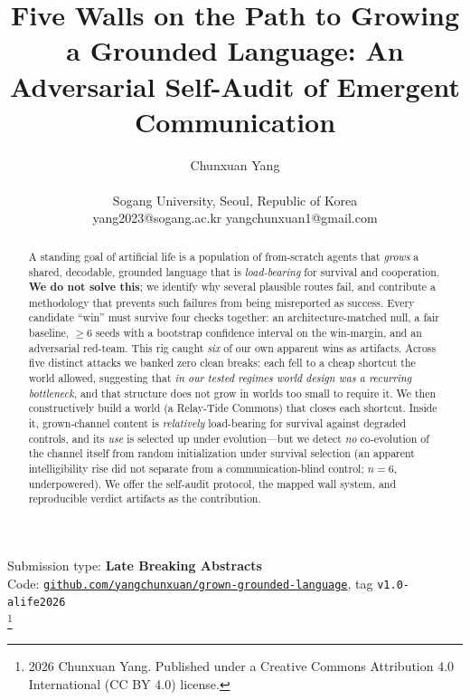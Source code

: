 \documentclass[letterpaper]{article}
\title{Five Walls on the Path to Growing a Grounded Language: An Adversarial Self-Audit of Emergent Communication}
\author{
    Chunxuan Yang \\
    \mbox{}\\
    Sogang University, Seoul, Republic of Korea \\
    yang2023@sogang.ac.kr \quad yangchunxuan1@gmail.com
}
\newcommand\blfootnote[1]{%
  \begingroup
  \renewcommand\thefootnote{}\footnote{#1}%
  \addtocounter{footnote}{-1}%
  \endgroup
}
\begin{document}
\maketitle

\begin{abstract}
A standing goal of artificial life is a population of from-scratch agents that
\emph{grows} a shared, decodable, grounded language that is \emph{load-bearing}
for survival and cooperation. \textbf{We do not solve this}; we identify why
several plausible routes fail, and contribute a methodology that prevents such
failures from being misreported as success. Every candidate ``win'' must survive
four checks together: an architecture-matched null, a fair baseline, $\geq$6
seeds with a bootstrap confidence interval on the win-margin, and an adversarial
red-team. This rig caught \emph{six} of our own apparent wins as artifacts.
Across five distinct attacks we banked zero clean breaks: each fell to a cheap
shortcut the world allowed, suggesting that \emph{in our tested regimes world
design was a recurring bottleneck}, and that structure does not grow in worlds too
small to require it. We then
constructively build a world (a Relay-Tide Commons) that closes each shortcut.
Inside it, grown-channel content is \emph{relatively} load-bearing for survival
against degraded controls, and its \emph{use} is selected up under evolution---but
we detect \emph{no} co-evolution of the channel itself from random initialization
under survival selection (an apparent intelligibility rise did not separate from a
communication-blind control; $n{=}6$, underpowered). We offer the self-audit protocol, the mapped wall
system, and reproducible verdict artifacts as the contribution.
\end{abstract}

Submission type: \textbf{Late Breaking Abstracts}\\

Code: \href{https://github.com/yangchunxuan/grown-grounded-language/tree/v1.0-alife2026}{\texttt{github.com/yangchunxuan/grown-grounded-language}}, tag \texttt{v1.0-alife2026}\\
\blfootnote{\textcopyright{} 2026 Chunxuan Yang. Published under a Creative Commons Attribution 4.0 International (CC BY 4.0) license.}
\end{document}
